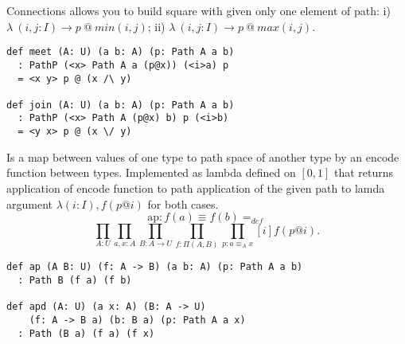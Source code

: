 \documentclass{article}
\begin{document}
\begin{definition}[Connections]
Connections allows you to build square with given only one element of path:
i) $\lambda\ (i,j: I) \rightarrow p\ @\ min(i,j)$;
ii) $\lambda\ (i,j:I) \rightarrow p\ @\ max(i,j)$.
\begin{center}
\end{center}
\begin{lstlisting}[mathescape=true]
def meet (A: U) (a b: A) (p: Path A a b)
  : PathP (<x> Path A a (p@x)) (<i>a) p
  = <x y> p @ (x /\ y)

def join (A: U) (a b: A) (p: Path A a b)
  : PathP (<x> Path A (p@x) b) p (<i>b)
  = <y x> p @ (x \/ y)
\end{lstlisting}
\end{definition}

\begin{theorem}[Congruence]
Is a map between values of one type
to path space of another type by an encode function between types.
Implemented as lambda defined on $[0,1]$ that returns
application of encode function to path application of
the given path to lamda argument $ \lambda (i:I), f (p @ i)$
for both cases.
$$
   \mathrm{ap} : f(a)\equiv f(b) =_{def}
$$
$$
   \prod_{A:U}\prod_{a,x:A}\prod_{B:A\rightarrow U}\prod_{f: \Pi(A,B)}\prod_{p:a\equiv_A x}[i] f(p@i).
$$
\begin{lstlisting}
def ap (A B: U) (f: A -> B) (a b: A) (p: Path A a b)
  : Path B (f a) (f b)

def apd (A: U) (a x: A) (B: A -> U)
    (f: A -> B a) (b: B a) (p: Path A a x)
  : Path (B a) (f a) (f x)
\end{lstlisting}
\end{theorem}
\end{document}
